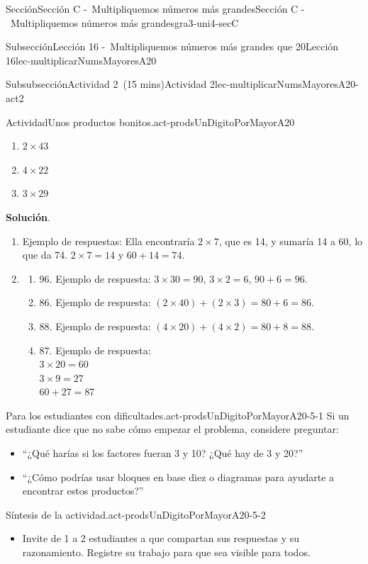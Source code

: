 \documentclass[oneside,10pt,]{article}
\newcommand{\blocktitlefont}{\relax}
\begin{document}
\begin{sectionptx}{Sección}{Sección C -~Multipliquemos números más grandes}{}{Sección C -~Multipliquemos números más grandes}{}{}{gra3-uni4-secC}
\begin{subsectionptx}{Subsección}{Lección 16 -~Multipliquemos números más grandes que 20}{}{Lección 16}{}{}{lec-multiplicarNumsMayoresA20}
\begin{subsubsectionptx}{Subsubsección}{Actividad 2~(15 mins)}{}{Actividad 2}{}{}{lec-multiplicarNumsMayoresA20-act2}
\begin{activity}{Actividad}{Unos productos bonitos.}{act-prodsUnDigitoPorMayorA20}
\begin{enumerate}
\begin{enumerate}
\item{}\(\displaystyle 2\times 43\)%
\item{}\(\displaystyle 4\times 22\)%
\item{}\(\displaystyle 3\times 29\)%
\end{enumerate}
\end{enumerate}
\par\smallskip%
\noindent\textbf{\blocktitlefont Solución}.\hypertarget{act-prodsUnDigitoPorMayorA20-3}{}\quad{}%
\begin{enumerate}
\item{}Ejemplo de respuestas: Ella encontraría \(2 \times 7\), que es 14, y sumaría 14 a 60, lo que da 74. \(2 \times 7 = 14\) y \(60 + 14 = 74\).%
\item{}%
\begin{enumerate}
\item{}96.  Ejemplo de respuesta: \(3 \times 30 = 90\), \(3 \times 2 = 6\), \(90 + 6 = 96\).%
\item{}86.  Ejemplo de respuesta: \((2 \times 40) + (2 \times 3) = 80 + 6 = 86\).%
\item{}88.  Ejemplo de respuesta: \((4 \times 20) + (4 \times 2) = 80 + 8 = 88\).%
\item{}87.  Ejemplo de respuesta:\\
 \(3 \times 20 = 60\)\\
 \(3 \times 9 = 27\)\\
 \(60 + 27 = 87\)%
\end{enumerate}
%
\end{enumerate}
\end{activity}%
\par
\begin{paragraphs}{Para los estudiantes con dificultades.}{act-prodsUnDigitoPorMayorA20-5-1}%
Si un estudiante dice que no sabe cómo empezar el problema, considere preguntar:%
%
\begin{itemize}[label=\textbullet]
\item{}``¿Qué harías si los factores fueran 3 y 10? ¿Qué hay de 3 y 20?''%
\item{}``¿Cómo podrías usar bloques en base diez o diagramas para ayudarte a encontrar estos productos?''%
\end{itemize}
\end{paragraphs}%
\begin{paragraphs}{Síntesis de la actividad.}{act-prodsUnDigitoPorMayorA20-5-2}%
%
\begin{itemize}[label=\textbullet]
\item{}Invite de 1 a 2 estudiantes a que compartan sus respuestas y su razonamiento. Registre su trabajo para que sea visible para todos.%

\end{itemize}
\end{paragraphs}
\end{subsubsectionptx}
\end{subsectionptx}
\end{sectionptx}
\end{document}
